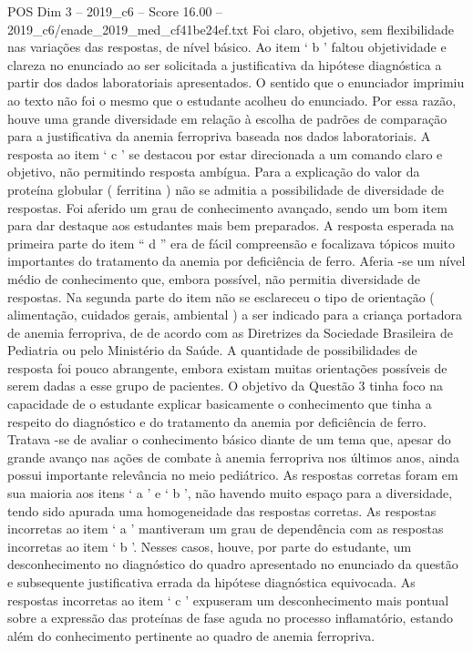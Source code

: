 \begin{textsample}{POS Dim 3 – 2019\_c6 – Score 16.00 – 2019\_c6/enade\_2019\_med\_cf41be24ef.txt}
Foi claro, objetivo, sem flexibilidade nas variações das respostas, de nível básico.
Ao item ‘ b ’ faltou objetividade e clareza no enunciado ao ser solicitada a justificativa da hipótese diagnóstica a partir dos dados laboratoriais apresentados.
O sentido que o enunciador imprimiu ao texto não foi o mesmo que o estudante acolheu do enunciado.
Por essa razão, houve uma grande diversidade em relação à escolha de padrões de comparação para a justificativa da anemia ferropriva baseada nos dados laboratoriais.
A resposta ao item ‘ c ’ se destacou por estar direcionada a um comando claro e objetivo, não permitindo resposta ambígua.
Para a explicação do valor da proteína globular ( ferritina ) não se admitia a possibilidade de diversidade de respostas.
Foi aferido um grau de conhecimento avançado, sendo um bom item para dar destaque aos estudantes mais bem preparados.
A resposta esperada na primeira parte do item “ d ” era de fácil compreensão e focalizava tópicos muito importantes do tratamento da anemia por deficiência de ferro.
Aferia -se um nível médio de conhecimento que, embora possível, não permitia diversidade de respostas.
Na segunda parte do item não se esclareceu o tipo de orientação ( alimentação, cuidados gerais, ambiental ) a ser indicado para a criança portadora de anemia ferropriva, de de acordo com as Diretrizes da Sociedade Brasileira de Pediatria ou pelo Ministério da Saúde.
A quantidade de possibilidades de resposta foi pouco abrangente, embora existam muitas orientações possíveis de serem dadas a esse grupo de pacientes.
O objetivo da Questão 3 tinha foco na capacidade de o estudante explicar basicamente o conhecimento que tinha a respeito do diagnóstico e do tratamento da anemia por deficiência de ferro.
Tratava -se de avaliar o conhecimento básico diante de um tema que, apesar do grande avanço nas ações de combate à anemia ferropriva nos últimos anos, ainda possui importante relevância no meio pediátrico.
As respostas corretas foram em sua maioria aos itens ‘ a ’ e ‘ b ’, não havendo muito espaço para a diversidade, tendo sido apurada uma homogeneidade das respostas corretas.
As respostas incorretas ao item ‘ a ’ mantiveram um grau de dependência com as respostas incorretas ao item ‘ b ’.
Nesses casos, houve, por parte do estudante, um desconhecimento no diagnóstico do quadro apresentado no enunciado da questão e subsequente justificativa errada da hipótese diagnóstica equivocada.
As respostas incorretas ao item ‘ c ’ expuseram um desconhecimento mais pontual sobre a expressão das proteínas de fase aguda no processo inflamatório, estando além do conhecimento pertinente ao quadro de anemia ferropriva.

\end{textsample}
